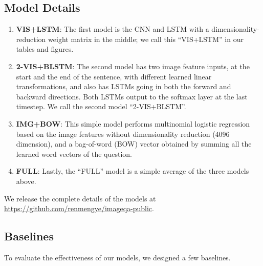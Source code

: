 \documentclass{article} \usepackage{nips15submit_e,times}
\renewcommand{\#}[1]{\textbf{#1}}
\begin{document}
\subsection{Model Details}
\begin{enumerate}[leftmargin=*]
\item \#{VIS+LSTM}: The first model is the CNN and LSTM with a
dimensionality-reduction weight matrix in the middle; we call this ``VIS+LSTM''
in our tables and figures.

\item \#{2-VIS+BLSTM}: The second model has two image feature inputs, at the
start and the end of the sentence, with different learned linear
transformations, and also has LSTMs going in both the forward and backward
directions. Both LSTMs output to the softmax layer at the last timestep. We
call the second model ``2-VIS+BLSTM''.

\item \#{IMG+BOW}: This simple model performs multinomial logistic regression
based on the image features without dimensionality reduction (4096 dimension),
and a bag-of-word (BOW) vector obtained by summing all the learned word vectors
of the question.

\item \#{FULL}: Lastly, the ``FULL'' model is a simple average of the three
models above.
\end{enumerate}

We release the complete details of the models at
\url{https://github.com/renmengye/imageqa-public}.

\subsection{Baselines}
To evaluate the effectiveness of our models, we designed a few baselines.
\end{document}
